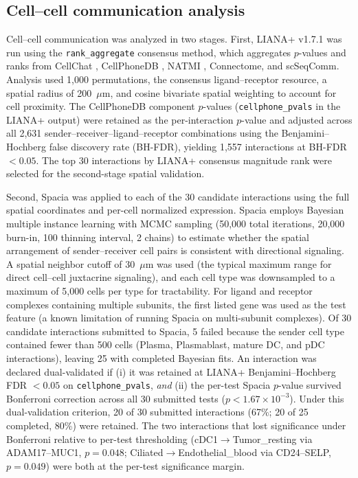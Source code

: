 \documentclass[12pt,a4paper]{article}
\begin{document}
\subsection*{Cell--cell communication analysis}
Cell--cell communication was analyzed in two stages. First, LIANA+ \citep{ramirez2024liana} v1.7.1 was run using the \texttt{rank\_aggregate} consensus method, which aggregates $p$-values and ranks from CellChat \citep{jin2021inference}, CellPhoneDB \citep{efremova2020cellphonedb}, NATMI \citep{hou2020predicting}, Connectome, and scSeqComm. Analysis used 1,000 permutations, the consensus ligand--receptor resource, a spatial radius of 200~$\mu$m, and cosine bivariate spatial weighting to account for cell proximity. The CellPhoneDB component $p$-values (\texttt{cellphone\_pvals} in the LIANA+ output) were retained as the per-interaction $p$-value and adjusted across all 2,631 sender--receiver--ligand--receptor combinations using the Benjamini--Hochberg false discovery rate (BH-FDR), yielding 1,557 interactions at BH-FDR $< 0.05$. The top 30 interactions by LIANA+ consensus magnitude rank were selected for the second-stage spatial validation.

Second, Spacia \citep{zhu2024spacia} was applied to each of the 30 candidate interactions using the full spatial coordinates and per-cell normalized expression. Spacia employs Bayesian multiple instance learning with MCMC sampling (50,000 total iterations, 20,000 burn-in, 100 thinning interval, 2 chains) to estimate whether the spatial arrangement of sender--receiver cell pairs is consistent with directional signaling. A spatial neighbor cutoff of 30~$\mu$m was used (the typical maximum range for direct cell--cell juxtacrine signaling), and each cell type was downsampled to a maximum of 5,000 cells per type for tractability. For ligand and receptor complexes containing multiple subunits, the first listed gene was used as the test feature (a known limitation of running Spacia on multi-subunit complexes). Of 30 candidate interactions submitted to Spacia, 5 failed because the sender cell type contained fewer than 500 cells (Plasma, Plasmablast, mature DC, and pDC interactions), leaving 25 with completed Bayesian fits. An interaction was declared dual-validated if (i) it was retained at LIANA+ Benjamini--Hochberg FDR $< 0.05$ on \texttt{cellphone\_pvals}, \emph{and} (ii) the per-test Spacia $p$-value survived Bonferroni correction across all 30 submitted tests ($p < 1.67 \times 10^{-3}$). Under this dual-validation criterion, 20 of 30 submitted interactions (67\%; 20 of 25 completed, 80\%) were retained. The two interactions that lost significance under Bonferroni relative to per-test thresholding (cDC1$\to$Tumor\_resting via ADAM17--MUC1, $p=0.048$; Ciliated$\to$Endothelial\_blood via CD24--SELP, $p=0.049$) were both at the per-test significance margin.
\end{document}
